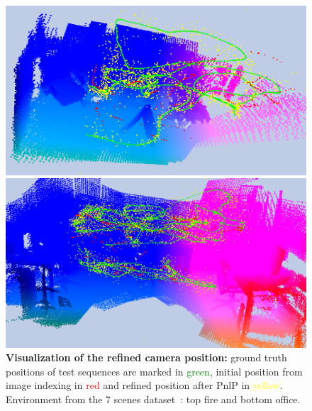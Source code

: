 \begin{figure}
	\centering
	
	\includegraphics[width=\linewidth]{results/models/fire}
	
	\includegraphics[width=\linewidth]{results/models/office}

	
	\caption[Refined position visualization -- 1]{\label{fig:res_visualization1} \textbf{Visualization of the refined camera position:} ground truth positions of test sequences are marked in \textcolor{green}{green}, initial position from image indexing in \textcolor{red}{red} and refined position after PnlP in \textcolor{yellow}{yellow}. Environment from the 7 scenes dataset~\citep{Shotton2013}: top fire and bottom office.}
	
\end{figure}

